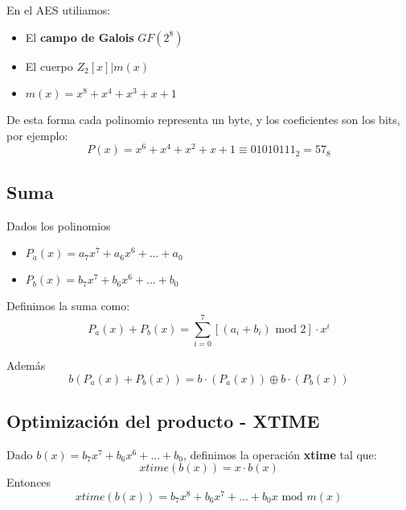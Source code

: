 En el AES utiliamos:
\begin{itemize}
	\item El \textbf{campo de Galois} $GF(2^8)$
	\item El cuerpo $Z_2[x]|m(x)$
	\item $m(x)= x^8 + x^4 + x^3 + x + 1$
\end{itemize}  

De esta forma cada polinomio representa un byte, y los coeficientes son los bits, por ejemplo:
$$P(x) = x^6 + x^4 + x^2 + x + 1 \equiv 01010111_2 = 57_8$$
 
 \subsection{Suma}
 Dados los polinomios
 \begin{itemize}
 	\item $P_a(x) = a_7x^7 + a_6x^6 +...+ a_0$
 	\item $P_b(x) = b_7x^7 + b_6x^6 +...+ b_0$
 \end{itemize}
 
 Definimos la suma como:
 $$P_a(x) + P_b(x) = \sum_{i=0}^{7} [(a_i + b_i) \text{ mod }2]\cdot x^i$$
 
 Además
 $$b(P_a(x) + P_b(x)) = b\cdot(P_a(x)) \oplus b \cdot (P_b(x))$$
 
 \subsection{Optimización del producto - XTIME}
 
 \begin{defn}[Xtime]
 	Dado $b(x) =b_7x^7 + b_6x^6 +...+ b_0$, definimos la operación \textbf{xtime} tal que:
 	$$xtime(b(x)) = x \cdot b(x)$$
 	Entonces
 	$$xtime(b(x)) =b_7x^8 + b_6x^7 +...+ b_0x \text{ mod }m(x) $$
 \end{defn}
 
